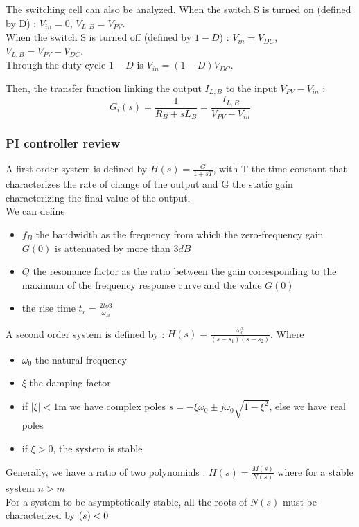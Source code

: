 \documentclass[../main.tex]{subfiles}
\begin{document}
The switching cell can also be analyzed. When the switch S is turned on (defined by D) : $V_{in} = 0$, $V_{L,B} = V_{PV}$.\\
When the switch S is turned off (defined by $1-D$) : $V_{in} = V_{DC} $, $V_{L,B} = V_{PV} - V_{DC}$.\\
Through the duty cycle $1-D$ is $V_{in} = (1-D) V_{DC}$.

Then, the transfer function linking the output $I_{L,B}$ to the input $V_{PV} - V_{in}$ : \begin{equation}
    G_i(s) = \frac{1}{R_B + sL_B} = \frac{I_{L,B}}{V_{PV} - V_{in}}
\end{equation}

\subsubsection{PI controller review}
A first order system is defined by $H(s) = \frac{G}{1+sT}$, with T the time constant that characterizes the rate of change of the output and G the static gain characterizing the final value of the output.\\

We can define \begin{itemize}
    \item $f_B$ the bandwidth as the frequency from which the zero-frequency gain $G(0)$ is attenuated by more than $3dB$
    \item $Q$ the resonance factor as the ratio between the gain corresponding to the maximum of the frequency response curve and the value $G(0)$
    \item the rise time $t_r = \frac{2 to 3}{\omega_B}$
\end{itemize}

A second order system is defined by : $H(s) = \frac{\omega_0^2}{(s-s_1)(s-s_2)}$. Where \begin{itemize}
    \item $\omega_0$ the natural frequency
    \item $\xi$ the damping factor
    \item if $\lvert \xi \rvert <1$m we have complex poles $s= -\xi \omega_0 \pm j \omega_0 \sqrt{1-\xi^2}$, else we have real poles
    \item if $\xi >0$, the system is stable
\end{itemize}

Generally, we have a ratio of two polynomials : $H(s)= \frac{M(s)}{N(s)}$ where for a stable system $n>m$\\
\warning For a system to be asymptotically stable, all the roots of $N(s)$ must be characterized by $\real(s)<0$\\
\end{document}
